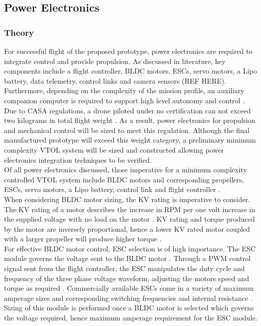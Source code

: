 \subsection{Power Electronics}

\subsubsection{Theory}
For successful flight of the proposed prototype, power electronics are required to integrate control and provide propulsion. As discussed in literature, key components include a flight controller, BLDC motors, ESCs, servo motors, a Lipo battery, data telemetry, control links and camera sensors (REF HERE). Furthermore, depending on the complexity of the mission profile, an auxiliary companion computer is required to support high level autonomy and control \cite{deci1995human}.\\

Due to CASA regulations, a drone piloted under no certification can not exceed two kilograms in total flight weight \cite{CASA}. As a result, power electronics for propulsion and mechanical control will be sized to meet this regulation. Although the final manufactured prototype will exceed this weight category, a preliminary minimum complexity VTOL system will be sized and constructed allowing power electronics integration techniques to be verified.\\

Of all power electronics discussed, those imperative for a minimum complexity controlled VTOL system include BLDC motors and corresponding propellers, ESCs, servo motors, a Lipo battery, control link and flight controller \cite{vervoorst2016modular}.\\

When considering BLDC motor sizing, the KV rating is imperative to consider. The KV rating of a motor describes the increase in RPM per one volt increase in the supplied voltage with no load on the motor \cite{shaikh2017design}. KV rating and torque produced by the motor are inversely proportional, hence a lower KV rated motor coupled with a larger propeller will produce higher torque \cite{shaikh2017design}.\\

For effective BLDC motor control, ESC selection is of high importance. The ESC module governs the voltage sent to the BLDC motor \cite{green2015modeling}. Through a PWM control signal sent from the flight controller, the ESC manipulates the duty cycle and frequency of the three phase voltage waveform, adjusting the motors speed and torque as required \cite{green2015modeling}. Commercially available ESCs come in a variety of maximum amperage sizes and corresponding switching frequencies and internal resistance \cite{green2015modeling}. Sizing of this module is performed once a BLDC motor is selected which governs the voltage required, hence maximum amperage requirement for the ESC module.\\

